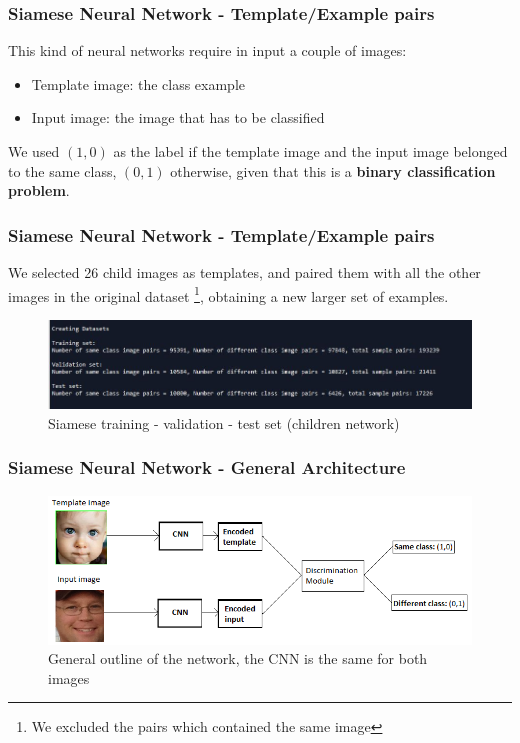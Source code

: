 \documentclass{beamer}
\begin{document}
	\begin{frame}
		\frametitle{Siamese Neural Network - Template/Example pairs}
		This kind of neural networks require in input a couple of images:
		\begin{itemize}
			\item Template image: the class example
			\item Input image: the image that has to be classified
		\end{itemize}		
		We used $(1,0)$ as the label if the template image and the input image belonged to the same class, $(0,1)$ otherwise, given that this is a \textbf{binary classification problem}.
	\end{frame}
	
	\begin{frame}
		\frametitle{Siamese Neural Network - Template/Example pairs}
		We selected 26 child images as templates, and paired them with all the other images in the original dataset \footnote{We excluded the pairs which contained the same image},		
		obtaining a new larger set of examples.
		\begin{figure}
			\centering
			\includegraphics[width=\textwidth]{img/siamese_training_set_children.JPG}
    		\caption{Siamese training - validation - test set (children network)}
    		\label{fig:siamese_general}
		\end{figure}
	\end{frame}
	
	\begin{frame}
		\frametitle{Siamese Neural Network - General Architecture}		
		\begin{figure}
			\centering
			\includegraphics[width=\textwidth]{img/siamese_schema_generale.png}
    		\caption{General outline of the network, the CNN is the same for both images}
    		\label{fig:siamese_dataset}
		\end{figure}
	\end{frame}
	
\end{document}
